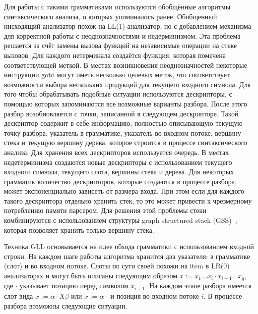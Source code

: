 Для работы с такими грамматиками используются обобщённые алгоритмы синтаксического анализа, о которых упоминалось ранее. Обобщенный нисходящий анализатор похож на LL(1)-анализатор, но с добавлением механизма для корректной работы с неоднозначностями и недерминизмом. Эта проблема решается за счёт замены вызова функций на независимые операции на стеке вызовов. Для каждого нетерминала создаётся функция, которая помечена соответствующей меткой. В местах возникновения неоднозначностей некоторые инструкции goto могут иметь несколько целевых меток, что соответствует возможности выбора нескольких продукций для текущего входного символа. Для того чтобы обрабатывать подобные ситуации используются дескрипторы, с помощью которых запоминаются все возможные варианты разбора. После этого разбор возобновляется с точки, записанной в следующем дескрипторе. Такой дескриптор  содержит в себе информацию, полностью описывающую текущую точку разбора: указатель в грамматике, указатель во входном потоке, вершину стека и текущую вершину дерева, которое строится в процессе синтаксического анализа. Для хранения всех дескрипторов используется очередь. В местах недетерминизма создаются новые дескрипторы с использованием текущего входного символа, текущего слота, вершины стека и дерева. Для некоторых грамматик количество дескрипторов, которые создаются в процессе разбора, может экспоненциально зависеть от размера входа. При этом если для каждого такого дескриптора отдельно хранить стек, то это может привести к чрезмерному потреблению памяти парсером. Для решения этой проблемы стеки комбинируются с использованием структуры graph structured stack (GSS)~\cite{tomita2}, которая позволяет хранить только вершину стека.

Техника GLL основывается на идее обхода грамматики с использованием входной строки. На каждом шаге работы алгоритма хранится два указателя: в грамматике (слот) и во входном потоке. Слоты по сути своей похожи на item в  LR(0) анализаторах и могут быть описаны следующим образом $x := x_1 . . . x_i \cdot x_{i+1} . . . x_q$, где $\cdot$ указывает позицию перед символом $x_{i+1}$. На каждом этапе разбора имеется слот вида $x := \alpha \cdot X \beta$ или $x := \alpha \cdot$ и позиция во входном потоке $i$. В процессе разбора возможны следующие ситуации.

